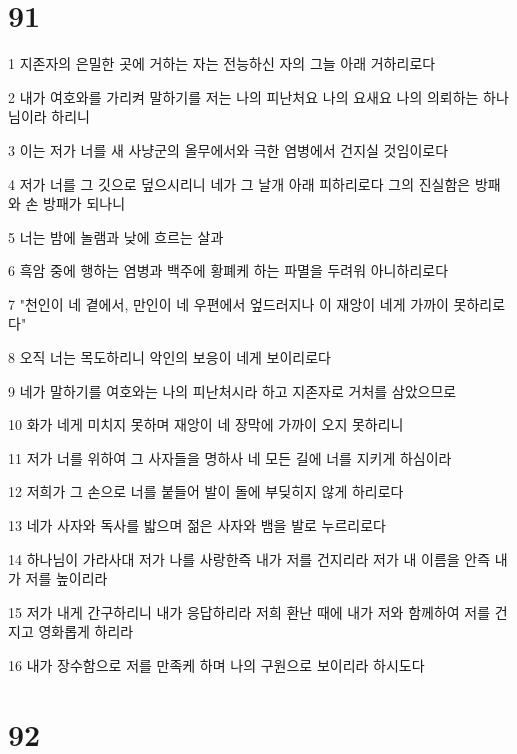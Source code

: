 \chapter{91}

\par 1 지존자의 은밀한 곳에 거하는 자는 전능하신 자의 그늘 아래 거하리로다
\par 2 내가 여호와를 가리켜 말하기를 저는 나의 피난처요 나의 요새요 나의 의뢰하는 하나님이라 하리니
\par 3 이는 저가 너를 새 사냥군의 올무에서와 극한 염병에서 건지실 것임이로다
\par 4 저가 너를 그 깃으로 덮으시리니 네가 그 날개 아래 피하리로다 그의 진실함은 방패와 손 방패가 되나니
\par 5 너는 밤에 놀램과 낮에 흐르는 살과
\par 6 흑암 중에 행하는 염병과 백주에 황폐케 하는 파멸을 두려워 아니하리로다
\par 7 "천인이 네 곁에서, 만인이 네 우편에서 엎드러지나 이 재앙이 네게 가까이 못하리로다"
\par 8 오직 너는 목도하리니 악인의 보응이 네게 보이리로다
\par 9 네가 말하기를 여호와는 나의 피난처시라 하고 지존자로 거처를 삼았으므로
\par 10 화가 네게 미치지 못하며 재앙이 네 장막에 가까이 오지 못하리니
\par 11 저가 너를 위하여 그 사자들을 명하사 네 모든 길에 너를 지키게 하심이라
\par 12 저희가 그 손으로 너를 붙들어 발이 돌에 부딪히지 않게 하리로다
\par 13 네가 사자와 독사를 밟으며 젊은 사자와 뱀을 발로 누르리로다
\par 14 하나님이 가라사대 저가 나를 사랑한즉 내가 저를 건지리라 저가 내 이름을 안즉 내가 저를 높이리라
\par 15 저가 내게 간구하리니 내가 응답하리라 저희 환난 때에 내가 저와 함께하여 저를 건지고 영화롭게 하리라
\par 16 내가 장수함으로 저를 만족케 하며 나의 구원으로 보이리라 하시도다

\chapter{92}

